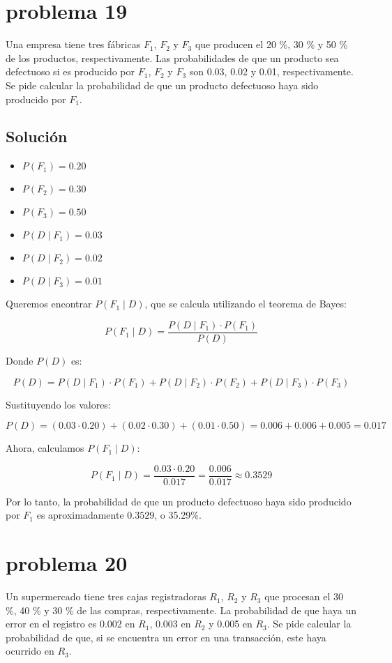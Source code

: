 \documentclass[12pt,a4paper]{article}
\begin{document}
\newpage 
\section*{problema 19}
Una empresa tiene tres fábricas \( F_1 \), \( F_2 \) y \( F_3 \) que producen el 20 \%, 30 \% y 50 \% de los productos, respectivamente. Las probabilidades de que un producto sea defectuoso si es producido por \( F_1 \), \( F_2 \) y \( F_3 \) son 0.03, 0.02 y 0.01, respectivamente. Se pide calcular la probabilidad de que un producto defectuoso haya sido producido por \( F_1 \).

\subsection*{Solución}

\begin{itemize}
    \item \( P(F_1) = 0.20 \)
    \item \( P(F_2) = 0.30 \)
    \item \( P(F_3) = 0.50 \)
    \item \( P(D \mid F_1) = 0.03 \)
    \item \( P(D \mid F_2) = 0.02 \)
    \item \( P(D \mid F_3) = 0.01 \)
\end{itemize}

Queremos encontrar \( P(F_1 \mid D) \), que se calcula utilizando el teorema de Bayes:

\[
P(F_1 \mid D) = \frac{P(D \mid F_1) \cdot P(F_1)}{P(D)}
\]

Donde \( P(D) \) es:

\[
P(D) = P(D \mid F_1) \cdot P(F_1) + P(D \mid F_2) \cdot P(F_2) + P(D \mid F_3) \cdot P(F_3)
\]

Sustituyendo los valores:

\[
P(D) = (0.03 \cdot 0.20) + (0.02 \cdot 0.30) + (0.01 \cdot 0.50) = 0.006 + 0.006 + 0.005 = 0.017
\]

Ahora, calculamos \( P(F_1 \mid D) \):

\[
P(F_1 \mid D) = \frac{0.03 \cdot 0.20}{0.017} = \frac{0.006}{0.017} \approx 0.3529
\]

Por lo tanto, la probabilidad de que un producto defectuoso haya sido producido por \( F_1 \) es aproximadamente \( 0.3529 \), o 35.29\%.
\newpage
\section*{problema 20}
Un supermercado tiene tres cajas registradoras \( R_1 \), \( R_2 \) y \( R_3 \) que procesan el 30 \%, 40 \% y 30 \% de las compras, respectivamente. La probabilidad de que haya un error en el registro es 0.002 en \( R_1 \), 0.003 en \( R_2 \) y 0.005 en \( R_3 \). Se pide calcular la probabilidad de que, si se encuentra un error en una transacción, este haya ocurrido en \( R_3 \).
\end{document}
